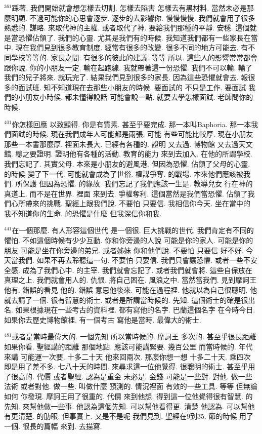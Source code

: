 \documentclass{book}
\begin{document}
$^{361}$踩著.
我們開始就會想怎樣去切割.
怎樣去陷害 怎樣去有黑材料.
當然未必是那麼明顯.
不過可能你的心思會逐步.
逐步的去影響你.
慢慢慢慢.
我們就會用了很多熟悉的.
謀略.
來取代神的主權.
或者取代了神.
要給我們那種的平靜.
安穩.
這個就是當恐懼佔領了.
我們的心靈.
尤其是我們有的時候.
我知道我們都有一些家長在當中.
現在我們見到很多教育制度.
經常有很多的改變.
很多不同的地方可能去.
有不同學校等等的.
家長之間.
有很多的彼此的建議.
等等 所以.
這些人的影響常常都會跟你說.
你的小朋友一定.
輸在起跑線.
我就帶著這一份恐懼.
我們不可以輸.
輸了我們的兒子將來.
就玩完了.
結果我們見到很多的家長.
因為這些恐懼就會去.
報很多的面試班.
知不知道現在去那些小朋友的時候.
要面試的 不只是工作.
要面試 我們的小朋友小時候.
都未懂得說話 可能會說一點.
就要去學怎樣面試.
老師問你的時候.

$^{401}$你怎樣回應 以致顯得.
你是有質素.
甚至乎要完成.
那一本叫Baphoria.
那一本我們面試的時候.
現在我們成年人可能都是兩張.
可能 有些可能比較厚.
現在小朋友那些一本書那麼厚.
裡面未長大.
已經有各種的.
證明 又去過.
博物館 又去過天文館.
總之要證明.
證明他有各種的活動.
教育的能力 來到去加入.
在他的所謂學校.
我們忘記了.
其實父母.
本來是小朋友的避風港.
但因為恐懼.
佔領了父母的心靈.
的時候 變了下一代.
可能就會成為了世俗.
權謀爭奪.
的戰場.
本來他們應該被我們.
所保護 但因為恐懼.
的緣故.
我們忘記了我們應該一生是.
教導兒女 行在神的真道上.
而不是在世界.
裡面 來到去.
爭權奪利.
這個當然是我們當恐懼.
佔領了我們心所帶來的挑戰.
聖經上跟我們說.
不要怕 只要信.
我相信你今天.
坐在當中的 我不知道你的生命.
的恐懼是什麼 但我深信你和我.

$^{441}$在一個那麼.
有人形容這個世代 是一個很.
巨大挑戰的世代.
我們肯定有不同的懼怕.
不如這個時候有少少互動.
你和你旁邊的人說 可能是你的家人.
可能是你的朋友 可能是坐在你旁邊的弟兄.
或者姊妹 你和他們說.
不要怕 只要信 好不好.
今天當我們.
如果不再去聆聽這一句.
不要怕 只要信.
我們只會讓恐懼.
或者一些不安全感.
成為了我們心中.
的主宰.
我們就會忘記了.
或者我們就會將.
這些自保放在真理之上.
我們就會用人的.
仇恨.
將自己困在.
風浪之中.
當然當我們.
見到摩訶王 他有.
錯誤的看見 他的.
錯誤 意思他後來.
可能在過程裡.
他就以為自己很聰明.
他就去請了一個.
很有智慧的術士.
或者是所謂當時候的.
先知.
這個術士的確是很出名.
如果根據現在一些考古的資料裡.
都有寫他的名字.
巴蘭這個名字 在今時今日.
如果你去歷史博物館裡.
有一個考古 寫他是當時.
最偉大的術士.

$^{481}$或者是當時最偉大的.
一個先知 所以當時候的.
摩訶王 多次的.
甚至乎很長距離 如果你看.
聖經講的距離 那個地點.
應該可能講緊要.
幾百公里 而當時候的.
年代來講 可能運一次要.
十多二十天 他來回兩次.
那麼你想一想 十多二十天.
乘四次 即是用了差不多.
七八十天的時間.
來尋求這一位他覺得.
很聰明的術士.
甚至乎用了很高的.
代價 或者聖經.
認為是重金 未必是.
金錢 可能是一些對.
對他.
做一些法術 或者對他.
做一些.
叫做什麼 預測的.
情況裡面 有效的一些工具.
等等 但無論如何 你發現.
摩訶王用了很重的.
代價 來到他想.
得到這一位他覺得很有智慧.
的先知.
來幫他做一些事.
他認為這個先知.
可以幫他看得更.
清楚 他認為.
可以幫他有更清楚.
的肋眼.
但事實上.
又是不是呢 我們見到.
聖經在9到35.
節的時候 用了一個.
很長的篇幅 來到.
去描寫.
\end{document}
